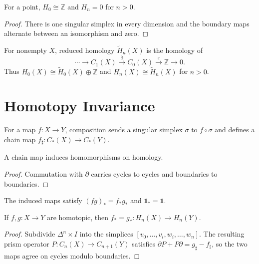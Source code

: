 \begin{proposition}
\label{prop:homology-point}
\uses{}
For a point, $H_0\cong\mathbb{Z}$ and $H_n=0$ for $n>0$.
\end{proposition}
\begin{proof}
\sketch There is one singular simplex in every dimension and the boundary maps alternate between an isomorphism and zero.
\end{proof}

For nonempty $X$, reduced homology $\widetilde H_n(X)$ is the homology of
\[
\cdots\to C_1(X)\xrightarrow{\partial}C_0(X)\xrightarrow{\varepsilon}\mathbb{Z}\to0.
\]
Thus $H_0(X)\cong\widetilde H_0(X)\oplus\mathbb{Z}$ and $H_n(X)\cong\widetilde H_n(X)$ for $n>0$.

\section*{Homotopy Invariance}

For a map $f:X\to Y$, composition sends a singular simplex $\sigma$ to $f\circ\sigma$ and defines a chain map $f_\sharp:C_*(X)\to C_*(Y)$.

\begin{proposition}
\label{prop:chain-map-induces-homology-homomorphism}
A chain map induces homomorphisms on homology.
\end{proposition}
\begin{proof}
\sketch Commutation with $\partial$ carries cycles to cycles and boundaries to boundaries.
\end{proof}

The induced maps satisfy $(fg)_*=f_*g_*$ and $\mathbb{1}_*=\mathbb{1}$.

\begin{theorem}
\label{thm:homotopic-maps-induce-same-homology-map}
If $f,g:X\to Y$ are homotopic, then $f_*=g_*:H_n(X)\to H_n(Y)$.
\end{theorem}
\begin{proof}
\sketch Subdivide $\Delta^n\times I$ into the simplices $[v_0,\ldots,v_i,w_i,\ldots,w_n]$.  The resulting prism operator $P:C_n(X)\to C_{n+1}(Y)$ satisfies $\partial P+P\partial=g_\sharp-f_\sharp$, so the two maps agree on cycles modulo boundaries.
\end{proof}

